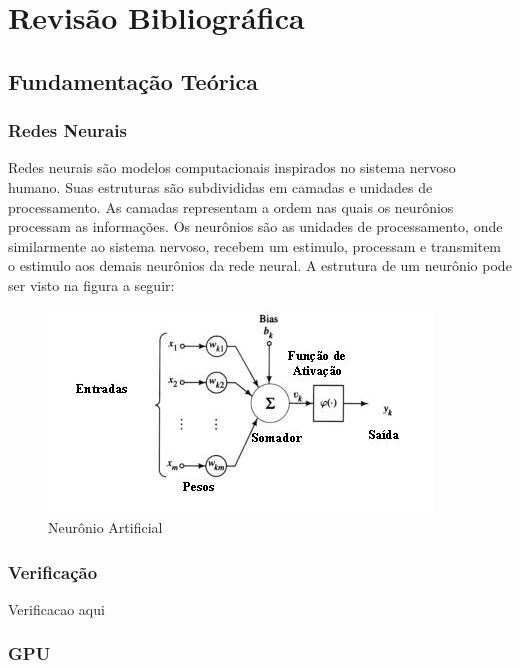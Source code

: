 \chapter{Revisão Bibliográfica} \label{cap2}
\section{Fundamentação Teórica}
\subsection{Redes Neurais}
Redes neurais são modelos computacionais inspirados no sistema nervoso humano. Suas estruturas são subdivididas em camadas e unidades de processamento. As camadas representam a ordem nas quais os neurônios processam as informações. Os neurônios são as unidades de processamento, onde similarmente ao sistema nervoso, recebem um estimulo, processam e transmitem o estimulo aos demais neurônios da rede neural. A estrutura de um neurônio pode ser visto na figura a seguir:
\begin{figure}[h]
	\centering
    \label{fig1}
    \vspace{3ex}%
	\includegraphics[scale=0.7]{pasta1_figuras/neuronio_artificial.jpg}
    \caption{Neurônio Artificial}
\end{figure}

\subsection{Verificação}
Verificacao aqui
\subsection{GPU}

